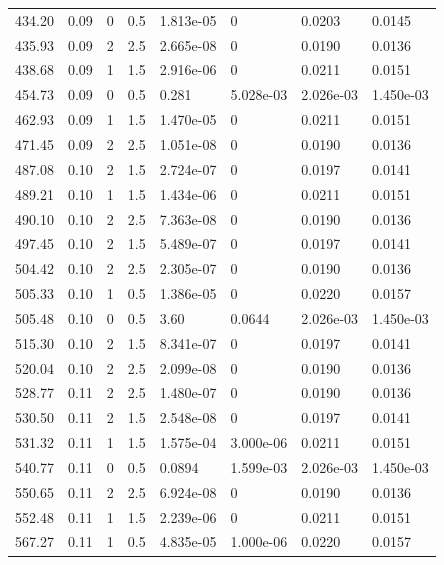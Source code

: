 \documentclass[preview]{standalone}
\begin{document}
{{{\begin{tabular}{L{1.2cm}C{1.2cm} C{0.3cm}C{0.5cm} C{1.4cm}C{1.4cm} C{1.4cm}C{1.4cm}}
  434.20  &  0.09  & 0     & 0.5 &  1.813e-05  & 0  & 0.0203 &  0.0145   \\ 
  435.93  &  0.09  & 2     & 2.5 &  2.665e-08  & 0  & 0.0190 &  0.0136   \\ 
  438.68  &  0.09  & 1     & 1.5 &  2.916e-06  & 0  & 0.0211 &  0.0151   \\ 
  454.73  &  0.09  & 0     & 0.5 &  0.281  & 5.028e-03  & 2.026e-03 &  1.450e-03   \\ 
  462.93  &  0.09  & 1     & 1.5 &  1.470e-05  & 0  & 0.0211 &  0.0151   \\ 
  471.45  &  0.09  & 2     & 2.5 &  1.051e-08  & 0  & 0.0190 &  0.0136   \\ 
  487.08  &  0.10  & 2     & 1.5 &  2.724e-07  & 0  & 0.0197 &  0.0141   \\ 
  489.21  &  0.10  & 1     & 1.5 &  1.434e-06  & 0  & 0.0211 &  0.0151   \\ 
  490.10  &  0.10  & 2     & 2.5 &  7.363e-08  & 0  & 0.0190 &  0.0136   \\ 
  497.45  &  0.10  & 2     & 1.5 &  5.489e-07  & 0  & 0.0197 &  0.0141   \\ 
  504.42  &  0.10  & 2     & 2.5 &  2.305e-07  & 0  & 0.0190 &  0.0136   \\ 
  505.33  &  0.10  & 1     & 0.5 &  1.386e-05  & 0  & 0.0220 &  0.0157   \\ 
  505.48  &  0.10  & 0     & 0.5 &  3.60  & 0.0644  & 2.026e-03 &  1.450e-03   \\ 
  515.30  &  0.10  & 2     & 1.5 &  8.341e-07  & 0  & 0.0197 &  0.0141   \\ 
  520.04  &  0.10  & 2     & 2.5 &  2.099e-08  & 0  & 0.0190 &  0.0136   \\ 
  528.77  &  0.11  & 2     & 2.5 &  1.480e-07  & 0  & 0.0190 &  0.0136   \\ 
  530.50  &  0.11  & 2     & 1.5 &  2.548e-08  & 0  & 0.0197 &  0.0141   \\ 
  531.32  &  0.11  & 1     & 1.5 &  1.575e-04  & 3.000e-06  & 0.0211 &  0.0151   \\ 
  540.77  &  0.11  & 0     & 0.5 &  0.0894  & 1.599e-03  & 2.026e-03 &  1.450e-03   \\ 
  550.65  &  0.11  & 2     & 2.5 &  6.924e-08  & 0  & 0.0190 &  0.0136   \\ 
  552.48  &  0.11  & 1     & 1.5 &  2.239e-06  & 0  & 0.0211 &  0.0151   \\ 
  567.27  &  0.11  & 1     & 0.5 &  4.835e-05  & 1.000e-06  & 0.0220 &  0.0157   \\ 

\end{tabular}}}}
\end{document}
